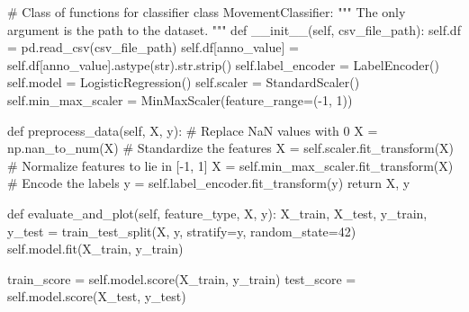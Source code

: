 \documentclass[
  letterpaper,
  DIV=11,
  numbers=noendperiod]{scrreprt}
\newenvironment{Shaded}{\begin{snugshade}}{\end{snugshade}}
\newcommand{\BuiltInTok}[1]{\textcolor[rgb]{0.00,0.23,0.31}{#1}}
\newcommand{\CommentTok}[1]{\textcolor[rgb]{0.37,0.37,0.37}{#1}}
\newcommand{\ControlFlowTok}[1]{\textcolor[rgb]{0.00,0.23,0.31}{#1}}
\newcommand{\DecValTok}[1]{\textcolor[rgb]{0.68,0.00,0.00}{#1}}
\newcommand{\FunctionTok}[1]{\textcolor[rgb]{0.28,0.35,0.67}{#1}}
\newcommand{\KeywordTok}[1]{\textcolor[rgb]{0.00,0.23,0.31}{#1}}
\newcommand{\NormalTok}[1]{\textcolor[rgb]{0.00,0.23,0.31}{#1}}
\newcommand{\OperatorTok}[1]{\textcolor[rgb]{0.37,0.37,0.37}{#1}}
\newcommand{\StringTok}[1]{\textcolor[rgb]{0.13,0.47,0.30}{#1}}
\newcommand{\VariableTok}[1]{\textcolor[rgb]{0.07,0.07,0.07}{#1}}
\begin{document}
\begin{Shaded}
\begin{Highlighting}[]
\CommentTok{\# Class of functions for classifier}
\KeywordTok{class}\NormalTok{ MovementClassifier:}
    \CommentTok{"""}
\CommentTok{    The only argument is the path to the dataset.}
\CommentTok{    """}
    \KeywordTok{def} \FunctionTok{\_\_init\_\_}\NormalTok{(}\VariableTok{self}\NormalTok{, csv\_file\_path):}
        \VariableTok{self}\NormalTok{.df }\OperatorTok{=}\NormalTok{ pd.read\_csv(csv\_file\_path)}
        \VariableTok{self}\NormalTok{.df[}\StringTok{\textquotesingle{}anno\_value\textquotesingle{}}\NormalTok{] }\OperatorTok{=} \VariableTok{self}\NormalTok{.df[}\StringTok{\textquotesingle{}anno\_value\textquotesingle{}}\NormalTok{].astype(}\BuiltInTok{str}\NormalTok{).}\BuiltInTok{str}\NormalTok{.strip()}
        \VariableTok{self}\NormalTok{.label\_encoder }\OperatorTok{=}\NormalTok{ LabelEncoder()}
        \VariableTok{self}\NormalTok{.model }\OperatorTok{=}\NormalTok{ LogisticRegression()}
        \VariableTok{self}\NormalTok{.scaler }\OperatorTok{=}\NormalTok{ StandardScaler()}
        \VariableTok{self}\NormalTok{.min\_max\_scaler }\OperatorTok{=}\NormalTok{ MinMaxScaler(feature\_range}\OperatorTok{=}\NormalTok{(}\OperatorTok{{-}}\DecValTok{1}\NormalTok{, }\DecValTok{1}\NormalTok{))}

    \KeywordTok{def}\NormalTok{ preprocess\_data(}\VariableTok{self}\NormalTok{, X, y):}
        \CommentTok{\# Replace NaN values with 0}
\NormalTok{        X }\OperatorTok{=}\NormalTok{ np.nan\_to\_num(X) }
        \CommentTok{\# Standardize the features}
\NormalTok{        X }\OperatorTok{=} \VariableTok{self}\NormalTok{.scaler.fit\_transform(X)}
        \CommentTok{\# Normalize features to lie in [{-}1, 1]}
\NormalTok{        X }\OperatorTok{=} \VariableTok{self}\NormalTok{.min\_max\_scaler.fit\_transform(X)}
        \CommentTok{\# Encode the labels}
\NormalTok{        y }\OperatorTok{=} \VariableTok{self}\NormalTok{.label\_encoder.fit\_transform(y)}
        \ControlFlowTok{return}\NormalTok{ X, y}

    \KeywordTok{def}\NormalTok{ evaluate\_and\_plot(}\VariableTok{self}\NormalTok{, feature\_type, X, y):}
\NormalTok{        X\_train, X\_test, y\_train, y\_test }\OperatorTok{=}\NormalTok{ train\_test\_split(X, y, stratify}\OperatorTok{=}\NormalTok{y, random\_state}\OperatorTok{=}\DecValTok{42}\NormalTok{)}
        \VariableTok{self}\NormalTok{.model.fit(X\_train, y\_train)}
        
\NormalTok{        train\_score }\OperatorTok{=} \VariableTok{self}\NormalTok{.model.score(X\_train, y\_train)}
\NormalTok{        test\_score }\OperatorTok{=} \VariableTok{self}\NormalTok{.model.score(X\_test, y\_test)}
        

\end{Highlighting}
\end{Shaded}
\end{document}
